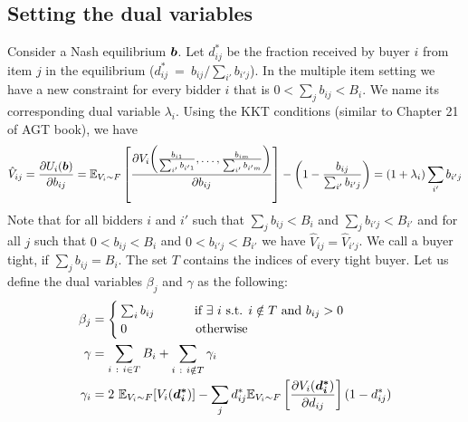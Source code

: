 \subsection{Setting the dual variables}

Consider a Nash equilibrium $\bm{b}$. Let $d_{ij}^*$ be the fraction received by buyer $i$ from item $j$ in the equilibrium ($d^{*}_{ij}~=~b_{ij}/\sum_{i'}b_{i'j}$).
In the multiple item setting we have a new constraint for every bidder $i$ that is $0 < \sum_{j} b_{ij} < B_{i}$. We name its corresponding dual variable $\lambda_i$. Using the KKT conditions (similar to Chapter 21 of AGT book), we have
$$
\hat{V}_{ij}
= \frac{\partial U_i(\bm{b})}{\partial b_{ij}}
= \mathbb{E}_{V_{i} \sim F}\left[\frac{\partial V_i\biggl(\frac{b_{i1}}{\sum_{i'} b_{i'1}}, \dots, \frac{b_{im}}{\sum_{i'} b_{i'm}}\biggr)}{\partial b_{ij}}\right] - \left(1 - \frac{b_{ij}}{\sum_{i'}b_{i'j}} \right)
= (1 + \lambda_i) \sum_{i'}b_{i'j}
$$
Note that for all bidders $i$ and $i'$ such that $\sum_{j} b_{ij} < B_{i}$ and $\sum_{j} b_{i'j} < B_{i'}$ and for all $j$ such that $0 < b_{ij} < B_{i}$ and $0 < b_{i'j} < B_{i'}$ we have
$\hat{V}_{ij}  = \hat{V}_{i'j}$.
%
We call a buyer tight, if $\sum_{j} b_{ij} = B_i$. The set $T$ contains the indices of every tight buyer.
Let us define the dual variables $\beta_j$ and $\gamma$ as the following:
\begin{align*}
    \beta_{j} &= \begin{cases}
        \sum_{i} b_{ij} \hspace{1cm} \text{ if }  \exists \ i \text{ s.t. } i \notin T \text{ and } b_{ij} > 0 \\
	    0 \hspace{1.8cm} \text{ otherwise} \end{cases}\\
	\gamma &= \sum_{i\ :\ i \in T} B_i  + \sum_{i \ : \ i \notin T} \gamma_{i}\\
	\gamma_{i} &= 2 \ \mathbb{E}_{V_{i} \sim F}[V_{i}(\bm{d^{*}_{i}})] - \sum_{j} d_{ij}^* \mathbb{E}_{V_{i} \sim F}\left[\frac{\partial V_{i}(\bm{d^{*}_{i}})}{\partial d_{ij}}\right] (1 - d_{ij}^*)
\end{align*}
